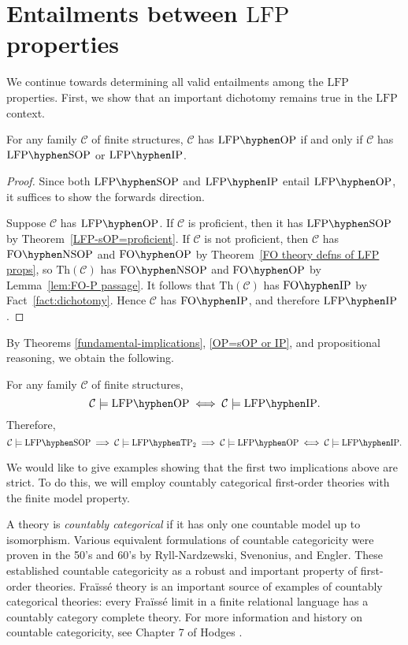 \documentclass{lmcs}
\newcommand{\Th}{\mathrm{Th}}
\newcommand{\LFP}{\mathrm{LFP}}
\newcommand{\FO}{\mathrm{FO}}
\newcommand{\FOP}[1]{\FO\hyphen#1}
\newcommand{\LFPP}[1]{\LFP\hyphen#1}
\newcommand{\OP}{\mathrm{OP}}
\newcommand{\IP}{\mathrm{IP}}
\newcommand{\SOP}{\mathrm{SOP}}
\newcommand{\NSOP}{\mathrm{NSOP}}
\newcommand{\TPT}{\mathrm{TP}_2}
\newcommand{\Fraisse}{Fra\"iss\'e\xspace}
\theoremstyle{thmC}
\begin{document}
\section{Entailments between \texorpdfstring{$\LFP$}{LFP} properties}\label{sec:entailments}

We continue towards determining all valid entailments among the $\LFP$ properties. First, we show that an important dichotomy remains true in the $\LFP$ context.

\begin{thm}\label{OP=sOP or IP}
For any family $\mathcal{C}$ of finite structures, 
$\mathcal{C}$ has $\LFPP{\OP}$ if and only if $\mathcal{C}$ has $\LFPP{\SOP}$ or $\LFPP{\IP}$.
\end{thm}

\begin{proof}
Since both $\LFPP{\SOP}$ and $\LFPP{\IP}$ entail $\LFPP{\OP}$, it suffices to show the forwards direction.

Suppose $\mathcal{C}$ has $\LFPP{\OP}$. If $\mathcal{C}$ is proficient, then it has $\LFPP{\SOP}$ by Theorem~\ref{LFP-sOP=proficient}. If $\mathcal{C}$ is not proficient, then $\mathcal{C}$ has $\FOP{\NSOP}$  and $\FOP{\OP}$ by Theorem~\ref{FO theory defns of LFP props}, so $\Th(\mathcal{C})$ has $\FOP{\NSOP}$ and $\FOP{\OP}$ by Lemma~\ref{lem:FO-P passage}. It follows that $\Th(\mathcal{C})$ has $\FOP{\IP}$ by Fact~\ref{fact:dichotomy}. Hence $\mathcal{C}$ has $\FOP{\IP}$, and therefore $\LFPP{\IP}$.  
\end{proof}

By Theorems \ref{fundamental-implications}, \ref{OP=sOP or IP}, and propositional reasoning, we obtain the following.

\begin{cor}\label{OP=IP}
For any family $\mathcal{C}$ of finite structures, 
\[ \mathcal{C} \models \LFPP{\OP}\iff 
\mathcal{C} \models \LFPP{\IP}.\]
Therefore,
\[ \mathcal{C} \models \LFPP{\SOP} \implies
\mathcal{C} \models \LFPP{\TPT} \implies
\mathcal{C} \models \LFPP{\OP} \iff 
\mathcal{C} \models \LFPP{\IP} .\]
\end{cor}

We would like to give examples showing that the first two implications above are strict. To do this, we will employ countably categorical first-order theories with the finite model property. 

A theory is \emph{countably categorical} if it 
has only one countable model up to isomorphism.
Various equivalent formulations of countable categoricity were proven in the 50's and 60's by Ryll-Nardzewski, Svenonius, and Engler. These established countable categoricity as a robust and important property of first-order theories. \Fraisse theory is an important source of examples of countably categorical theories: every \Fraisse limit in a finite relational language has a countably category complete theory. For more information and history on countable categoricity, see Chapter 7 of Hodges \cite{Hodges}.
\end{document}
